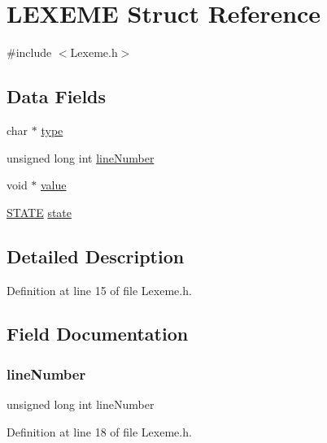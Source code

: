 \hypertarget{struct_l_e_x_e_m_e}{}\section{L\+E\+X\+E\+ME Struct Reference}
\label{struct_l_e_x_e_m_e}


{\ttfamily \#include $<$Lexeme.\+h$>$}

\subsection*{Data Fields}
\begin{DoxyCompactItemize}
\item 
char $\ast$ \hyperlink{struct_l_e_x_e_m_e_a23506fc4821ab6d9671f3e6222591a96}{type}
\item 
unsigned long int \hyperlink{struct_l_e_x_e_m_e_a3f19ebeaa8c130292bd9ce502be1d1a3}{line\+Number}
\item 
void $\ast$ \hyperlink{struct_l_e_x_e_m_e_a0f61d63b009d0880a89c843bd50d8d76}{value}
\item 
\hyperlink{_state_machine_8h_a275a67132f10277ada3a0ee3d616b647}{S\+T\+A\+TE} \hyperlink{struct_l_e_x_e_m_e_a390ef51e2cfd455504254347218a71ca}{state}
\end{DoxyCompactItemize}


\subsection{Detailed Description}


Definition at line 15 of file Lexeme.\+h.



\subsection{Field Documentation}
\mbox{\label{struct_l_e_x_e_m_e_a3f19ebeaa8c130292bd9ce502be1d1a3}} 
\subsubsection{\texorpdfstring{line\+Number}{lineNumber}}
{\footnotesize\ttfamily unsigned long int line\+Number}



Definition at line 18 of file Lexeme.\+h.

